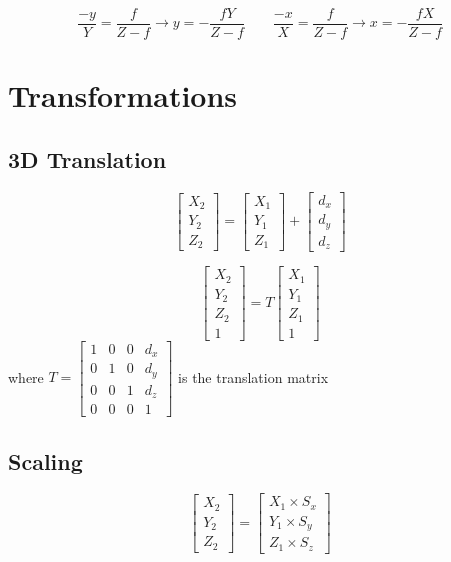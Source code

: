 \documentclass{article}
\begin{document}
\[\frac{-y}{Y}=\frac{f}{Z-f}\rightarrow y=-\frac{fY}{Z-f}\quad\quad \frac{-x}{X}=\frac{f}{Z-f}\rightarrow x =-\frac{fX}{Z-f}\]

\section*{Transformations}
\subsection*{3D Translation}
\[\begin{bmatrix}
    X_2 \\ Y_2 \\ Z_2
\end{bmatrix} = \begin{bmatrix}
    X_1 \\ Y_1 \\ Z_1
\end{bmatrix} + \begin{bmatrix}
    d_x \\ d_y \\ d_z
\end{bmatrix}\]

\[\begin{bmatrix}
    X_2 \\ Y_2 \\ Z_2 \\ 1
\end{bmatrix} = T \begin{bmatrix}
    X_1 \\ Y_1 \\ Z_1 \\ 1
\end{bmatrix}\] where $T=\begin{bmatrix}
    1 & 0 & 0 & d_x \\
    0 & 1 & 0 & d_y \\
    0 & 0 & 1 & d_z \\
    0 & 0 & 0 & 1
\end{bmatrix}$ is the translation matrix

\subsection*{Scaling}
\[\begin{bmatrix}
    X_2 \\ Y_2 \\ Z_2
\end{bmatrix} = \begin{bmatrix}
    X_1 \times S_x \\ Y_1 \times S_y \\ Z_1 \times S_z
\end{bmatrix}\]
\end{document}
